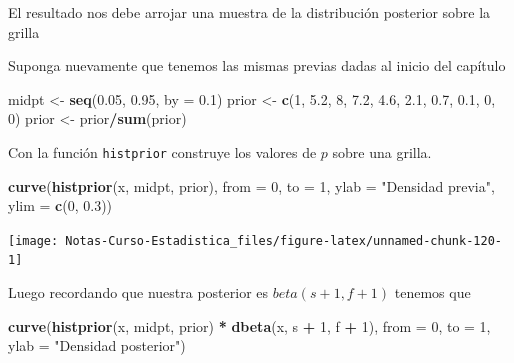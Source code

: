 \documentclass[
  12pt,
]{book}
\newenvironment{Shaded}{\begin{snugshade}}{\end{snugshade}}
\newcommand{\DataTypeTok}[1]{\textcolor[rgb]{0.13,0.29,0.53}{#1}}
\newcommand{\DecValTok}[1]{\textcolor[rgb]{0.00,0.00,0.81}{#1}}
\newcommand{\FloatTok}[1]{\textcolor[rgb]{0.00,0.00,0.81}{#1}}
\newcommand{\KeywordTok}[1]{\textcolor[rgb]{0.13,0.29,0.53}{\textbf{#1}}}
\newcommand{\NormalTok}[1]{#1}
\newcommand{\OperatorTok}[1]{\textcolor[rgb]{0.81,0.36,0.00}{\textbf{#1}}}
\newcommand{\StringTok}[1]{\textcolor[rgb]{0.31,0.60,0.02}{#1}}
\theoremstyle{definition}
\theoremstyle{definition}
\theoremstyle{definition}
\theoremstyle{remark}
\begin{document}
El resultado nos debe arrojar una muestra de la distribución posterior
sobre la grilla

Suponga nuevamente que tenemos las mismas previas dadas al inicio del
capítulo

\begin{Shaded}
\begin{Highlighting}[]
\NormalTok{midpt <-}\StringTok{ }\KeywordTok{seq}\NormalTok{(}\FloatTok{0.05}\NormalTok{, }\FloatTok{0.95}\NormalTok{, }\DataTypeTok{by =} \FloatTok{0.1}\NormalTok{)}
\NormalTok{prior <-}\StringTok{ }\KeywordTok{c}\NormalTok{(}\DecValTok{1}\NormalTok{, }\FloatTok{5.2}\NormalTok{, }\DecValTok{8}\NormalTok{, }\FloatTok{7.2}\NormalTok{, }\FloatTok{4.6}\NormalTok{, }\FloatTok{2.1}\NormalTok{, }\FloatTok{0.7}\NormalTok{, }\FloatTok{0.1}\NormalTok{, }\DecValTok{0}\NormalTok{, }\DecValTok{0}\NormalTok{)}
\NormalTok{prior <-}\StringTok{ }\NormalTok{prior}\OperatorTok{/}\KeywordTok{sum}\NormalTok{(prior)}
\end{Highlighting}
\end{Shaded}

Con la función \texttt{histprior} construye los valores de \(p\) sobre una
grilla.

\begin{Shaded}
\begin{Highlighting}[]
\KeywordTok{curve}\NormalTok{(}\KeywordTok{histprior}\NormalTok{(x, midpt, prior), }\DataTypeTok{from =} \DecValTok{0}\NormalTok{, }\DataTypeTok{to =} \DecValTok{1}\NormalTok{, }
    \DataTypeTok{ylab =} \StringTok{"Densidad previa"}\NormalTok{, }\DataTypeTok{ylim =} \KeywordTok{c}\NormalTok{(}\DecValTok{0}\NormalTok{, }\FloatTok{0.3}\NormalTok{))}
\end{Highlighting}
\end{Shaded}

\begin{center}\texttt{[image: Notas-Curso-Estadistica\_files/figure-latex/unnamed-chunk-120-1]} \end{center}

Luego recordando que nuestra posterior es \(beta(s+1,f+1)\) tenemos que

\begin{Shaded}
\begin{Highlighting}[]
\KeywordTok{curve}\NormalTok{(}\KeywordTok{histprior}\NormalTok{(x, midpt, prior) }\OperatorTok{*}\StringTok{ }\KeywordTok{dbeta}\NormalTok{(x, s }\OperatorTok{+}\StringTok{ }\DecValTok{1}\NormalTok{, }
\NormalTok{    f }\OperatorTok{+}\StringTok{ }\DecValTok{1}\NormalTok{), }\DataTypeTok{from =} \DecValTok{0}\NormalTok{, }\DataTypeTok{to =} \DecValTok{1}\NormalTok{, }\DataTypeTok{ylab =} \StringTok{"Densidad posterior"}\NormalTok{)}
\end{Highlighting}
\end{Shaded}
\end{document}
